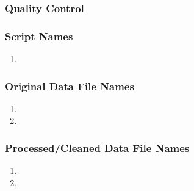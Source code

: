 \subsubsection*{Quality Control}

\subsubsection*{Script Names}

\begin{enumerate}
\item 
\end{enumerate}

\subsubsection*{Original Data File Names}

\begin{enumerate}
\item 
\item 
\end{enumerate}

\subsubsection*{Processed/Cleaned Data File Names}

\begin{enumerate}
\item 
\item 
\end{enumerate}